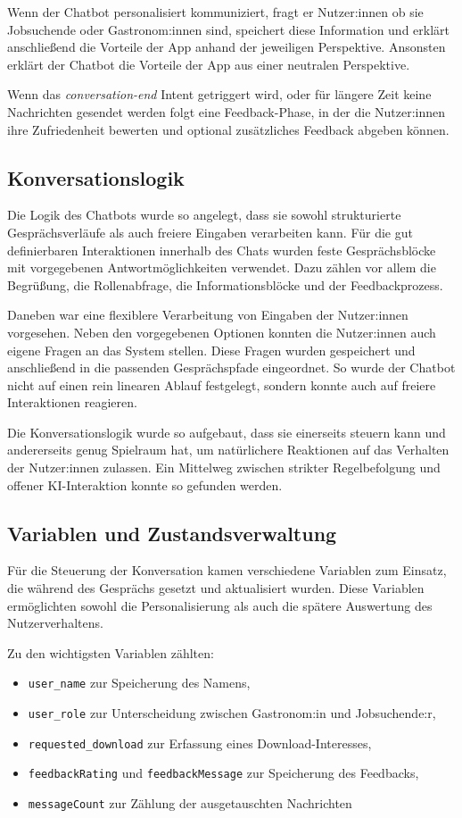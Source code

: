 Wenn der Chatbot personalisiert kommuniziert, fragt er Nutzer:innen ob sie 
Jobsuchende oder Gastronom:innen sind, speichert diese Information und erklärt
anschließend die Vorteile der App anhand der jeweiligen Perspektive. Ansonsten
erklärt der Chatbot die Vorteile der App aus einer neutralen Perspektive.

Wenn das \textit{conversation-end} Intent getriggert wird, oder für längere 
Zeit keine Nachrichten gesendet werden folgt eine
Feedback-Phase, in der die Nutzer:innen ihre Zufriedenheit bewerten und
optional zusätzliches Feedback abgeben können.

\subsection{Konversationslogik}

Die Logik des Chatbots wurde so angelegt, dass sie sowohl
strukturierte Gesprächsverläufe als auch freiere Eingaben
verarbeiten kann. Für die gut definierbaren Interaktionen innerhalb
des Chats wurden feste Gesprächsblöcke mit vorgegebenen
Antwortmöglichkeiten verwendet. Dazu zählen vor allem die
Begrüßung, die Rollenabfrage, die Informationsblöcke und der
Feedbackprozess.

Daneben war eine flexiblere Verarbeitung von Eingaben der
Nutzer:innen vorgesehen. Neben den vorgegebenen Optionen konnten
die Nutzer:innen auch eigene Fragen an das System stellen. Diese
Fragen wurden gespeichert und anschließend in die passenden
Gesprächspfade eingeordnet. So wurde der Chatbot nicht auf einen
rein linearen Ablauf festgelegt, sondern konnte auch auf freiere
Interaktionen reagieren.

Die Konversationslogik wurde so aufgebaut, dass sie einerseits
steuern kann und andererseits genug Spielraum hat, um
natürlichere Reaktionen auf das Verhalten der Nutzer:innen
zulassen. Ein Mittelweg zwischen strikter Regelbefolgung und offener
KI-Interaktion konnte so gefunden werden.

\subsection{Variablen und Zustandsverwaltung}

Für die Steuerung der Konversation kamen verschiedene Variablen zum Einsatz, 
die während des Gesprächs gesetzt und aktualisiert wurden. Diese Variablen 
ermöglichten sowohl die Personalisierung als auch die spätere Auswertung des 
Nutzerverhaltens.

Zu den wichtigsten Variablen zählten:
\begin{itemize}
    \item \texttt{user\_name} zur Speicherung des Namens,
    \item \texttt{user\_role} zur Unterscheidung zwischen
    Gastronom:in und Jobsuchende:r,
    \item \texttt{requested\_download} zur Erfassung eines
    Download-Interesses,
    \item \texttt{feedbackRating} und \texttt{feedbackMessage} zur
    Speicherung des Feedbacks,
    \item \texttt{messageCount} zur Zählung der ausgetauschten
    Nachrichten
\end{itemize}

